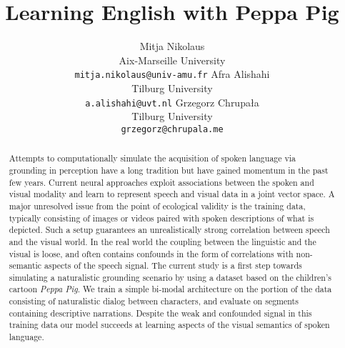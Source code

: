 \documentclass[11pt,a4paper]{article}
\begin{document}
\title{Learning English with Peppa Pig}

\author{Mitja Nikolaus\\
  Aix-Marseille University\\
  \texttt{mitja.nikolaus@univ-amu.fr}
  \And
  Afra Alishahi\\
  Tilburg University\\
  \texttt{a.alishahi@uvt.nl}
  \AND
  Grzegorz Chrupała\\
  Tilburg University\\
  \texttt{grzegorz@chrupala.me}}

\date{}


\maketitle
\begin{abstract}
  Attempts to computationally simulate the acquisition of spoken
  language via grounding in perception have a long tradition
  but have gained momentum in the past few years.  Current neural
  approaches exploit associations between the spoken and
  visual modality and learn to represent speech and visual data
  in a joint vector space. A major unresolved issue from the point
  of ecological validity is the training data, typically consisting of
  images or videos paired with spoken descriptions of what is
  depicted. Such a setup guarantees an unrealistically strong
  correlation between speech and the visual world.  In
  the real world the coupling between the linguistic and the visual is
  loose, and often contains confounds in the form of correlations with
  non-semantic aspects of the speech signal. The current study is a
  first step towards simulating a naturalistic grounding scenario by
  using a dataset based on the children's cartoon {\it Peppa Pig}. We
  train a simple bi-modal architecture on the portion of the data
  consisting of naturalistic dialog between characters, and evaluate
  on segments containing descriptive narrations. Despite the weak and confounded
  signal in this training data our model succeeds at learning aspects
  of the visual semantics of spoken language.
\end{abstract}










%
\end{document}

